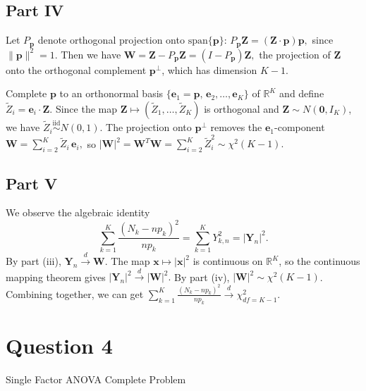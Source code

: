 \documentclass[letterpaper]{article}
\begin{document}
		\clearpage
		\subsection{Part IV}
		
		 Let $P_{\mathbf{p}}$ denote orthogonal projection onto $\mathrm{span}\{\mathbf{p}\}$:
			$
			P_{\mathbf{p}}\mathbf{Z} = (\mathbf{Z}\cdot\mathbf{p})\mathbf{p},
			$
			since $\|\mathbf{p}\|^2 = 1$. Then we have
			$
			\mathbf{W} = \mathbf{Z} - P_{\mathbf{p}}\mathbf{Z} = (I - P_{\mathbf{p}})\mathbf{Z},
			$
			the projection of $\mathbf{Z}$ onto the orthogonal complement $\mathbf{p}^{\perp}$, which has
			dimension $K - 1$.
			
			Complete $\mathbf{p}$ to an orthonormal basis $\{\mathbf{e}_1 = \mathbf{p},\, \mathbf{e}_2,
			\ldots, \mathbf{e}_K\}$ of $\mathbb{R}^K$ and define $\widetilde{Z}_i = \mathbf{e}_i\cdot\mathbf{Z}$.
			Since the map $\mathbf{Z} \mapsto (\widetilde{Z}_1, \ldots, \widetilde{Z}_K)$ is orthogonal and
			$\mathbf{Z} \sim N(\mathbf{0}, I_K)$, we have $\widetilde{Z}_i \overset{\text{iid}}{\sim} N(0,1)$.
			The projection onto $\mathbf{p}^{\perp}$ removes the $\mathbf{e}_1$-component 
			$
			\mathbf{W} = \sum_{i=2}^{K} \widetilde{Z}_i\,\mathbf{e}_i,
			$
			so
			$
			|\mathbf{W}|^2 = \mathbf{W}^T\mathbf{W} = \sum_{i=2}^{K} \widetilde{Z}_i^2 \sim \chi^2(K-1). 
			$
			
		\clearpage
		\subsection{Part V}
			We observe the algebraic identity
			\[
			\sum_{k=1}^{K} \frac{(N_k - np_k)^2}{np_k}
			= \sum_{k=1}^{K} Y_{k,n}^2
			= |\mathbf{Y}_n|^2.
			\]
			By part (iii), $\mathbf{Y}_n \xrightarrow{d} \mathbf{W}$. The map $\mathbf{x} \mapsto
			|\mathbf{x}|^2$ is continuous on $\mathbb{R}^K$, so the continuous mapping theorem gives
			$
			|\mathbf{Y}_n|^2 \xrightarrow{d} |\mathbf{W}|^2.
			$
			By part (iv), $|\mathbf{W}|^2 \sim \chi^2(K-1)$. Combining together, we can get
			$
			\sum_{k=1}^{K} \frac{(N_k - np_k)^2}{np_k} \xrightarrow{d} \chi^2_{df=K-1}. 
			$
			
		
		\clearpage
		
		\section{Question 4}
		
		{\color{deepred} Single Factor ANOVA Complete Problem}
		
\end{document}
